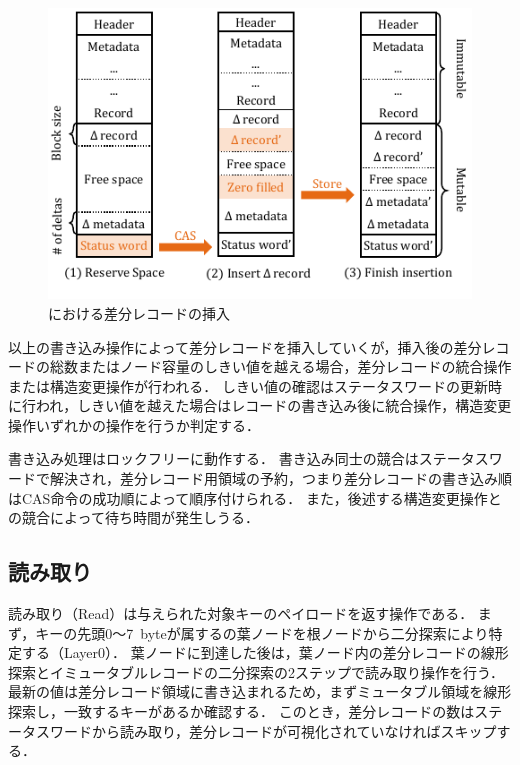 \begin{figure}[t]
    \centering
    \includegraphics{./figures/Bc-insertion.pdf}
    \caption{\Bctree{}における差分レコードの挿入}
    \label{fig:bc_tree_insertion}
\end{figure}

以上の書き込み操作によって差分レコードを挿入していくが，挿入後の差分レコードの総数またはノード容量のしきい値を越える場合，差分レコードの統合操作または構造変更操作が行われる．
しきい値の確認はステータスワードの更新時に行われ，しきい値を越えた場合はレコードの書き込み後に統合操作，構造変更操作いずれかの操作を行うか判定する．

書き込み処理はロックフリーに動作する．
書き込み同士の競合はステータスワードで解決され，差分レコード用領域の予約，つまり差分レコードの書き込み順はCAS命令の成功順によって順序付けられる．
また，後述する構造変更操作との競合によって待ち時間が発生しうる．

\subsection{読み取り}
読み取り（Read）は与えられた対象キーのペイロードを返す操作である．
まず，キーの先頭0～7~byteが属するの葉ノードを根ノードから二分探索により特定する（Layer0）．
葉ノードに到達した後は，葉ノード内の差分レコードの線形探索とイミュータブルレコードの二分探索の2ステップで読み取り操作を行う．
最新の値は差分レコード領域に書き込まれるため，まずミュータブル領域を線形探索し，一致するキーがあるか確認する．
このとき，差分レコードの数はステータスワードから読み取り，差分レコードが可視化されていなければスキップする．


